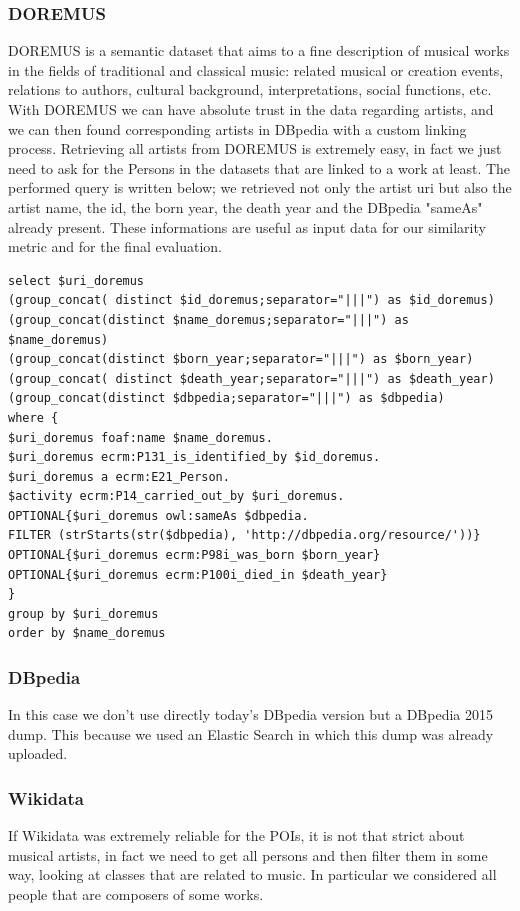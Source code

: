 \documentclass[paper=a4, fontsize=11pt]{scrartcl}
\begin{document}
\subsubsection{DOREMUS}
DOREMUS is a semantic dataset that aims to a fine description of musical works in the fields of traditional and classical music: related musical or creation events, relations to authors, cultural background, interpretations, social functions, etc.
With DOREMUS we can have absolute trust in the data regarding artists, and we can then found corresponding artists in DBpedia with a custom linking process.
Retrieving all artists from DOREMUS is extremely easy, in fact we just need to ask for the Persons in the datasets that are linked to a work at least. The performed query is written below; we retrieved not only the artist uri but also the artist name, the id,  the born year, the death year and the DBpedia "sameAs" already present. These informations are useful as input data for our similarity metric and for the final evaluation.

\begin{lstlisting}
select $uri_doremus 
(group_concat( distinct $id_doremus;separator="|||") as $id_doremus)
(group_concat(distinct $name_doremus;separator="|||") as $name_doremus) 
(group_concat(distinct $born_year;separator="|||") as $born_year) 
(group_concat( distinct $death_year;separator="|||") as $death_year) 
(group_concat(distinct $dbpedia;separator="|||") as $dbpedia) 
where {
$uri_doremus foaf:name $name_doremus.
$uri_doremus ecrm:P131_is_identified_by $id_doremus.
$uri_doremus a ecrm:E21_Person.
$activity ecrm:P14_carried_out_by $uri_doremus.
OPTIONAL{$uri_doremus owl:sameAs $dbpedia.
FILTER (strStarts(str($dbpedia), 'http://dbpedia.org/resource/'))}
OPTIONAL{$uri_doremus ecrm:P98i_was_born $born_year}
OPTIONAL{$uri_doremus ecrm:P100i_died_in $death_year}
} 
group by $uri_doremus
order by $name_doremus
\end{lstlisting}

\subsubsection{DBpedia}
In this case we don't use directly today's DBpedia version but a DBpedia 2015 dump. This because we used an Elastic Search in which this dump was already uploaded.

\subsubsection{Wikidata}
If Wikidata was extremely reliable for the POIs, it is not that strict about musical artists, in fact we need to get all persons and then filter them in some way, looking at classes that are related to music. In particular we considered all people that are composers of some works. 
\end{document}
